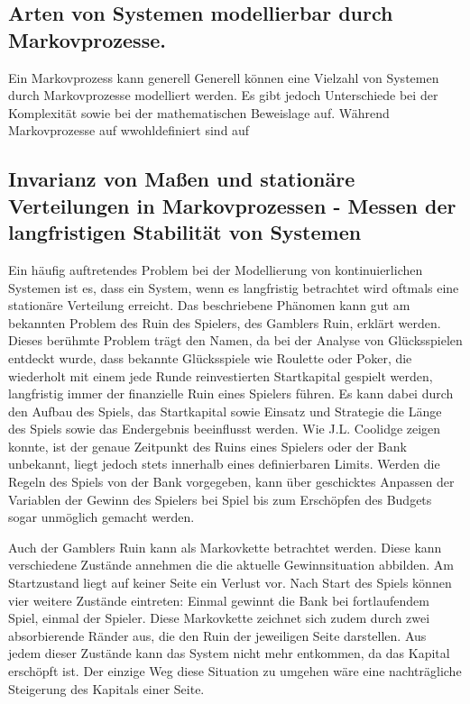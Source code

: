 \subsection{Arten von Systemen modellierbar durch Markovprozesse.}

Ein Markovprozess kann generell 
Generell können eine Vielzahl von Systemen durch Markovprozesse modelliert werden. Es gibt jedoch Unterschiede bei der Komplexität sowie bei der mathematischen Beweislage auf. Während Markovprozesse auf wwohldefiniert sind auf

\subsection{Invarianz von Maßen und stationäre Verteilungen in Markovprozessen - Messen der langfristigen Stabilität von Systemen}

Ein häufig auftretendes Problem bei der Modellierung von kontinuierlichen Systemen ist es, dass ein System, wenn es langfristig betrachtet wird oftmals eine stationäre Verteilung erreicht. Das beschriebene Phänomen kann gut am bekannten Problem des Ruin des Spielers, des Gamblers Ruin, erklärt werden. Dieses berühmte Problem trägt den Namen, da bei der Analyse von Glücksspielen entdeckt wurde, dass bekannte Glücksspiele wie Roulette oder Poker, die wiederholt mit einem jede Runde reinvestierten Startkapital gespielt werden, langfristig immer der finanzielle Ruin eines Spielers führen. Es kann dabei durch den Aufbau des Spiels, das Startkapital sowie Einsatz und Strategie die Länge des Spiels sowie das Endergebnis beeinflusst werden. Wie J.L. Coolidge zeigen konnte, ist der genaue Zeitpunkt des Ruins eines Spielers oder der Bank unbekannt, liegt jedoch stets innerhalb eines definierbaren Limits. Werden die Regeln des Spiels von der Bank vorgegeben, kann über geschicktes Anpassen der Variablen der Gewinn des Spielers bei Spiel bis zum Erschöpfen des Budgets sogar unmöglich gemacht werden. \citep{coolidge1909gamblers}

Auch der Gamblers Ruin kann als Markovkette betrachtet werden. Diese kann verschiedene Zustände annehmen die die aktuelle Gewinnsituation abbilden. Am Startzustand liegt auf keiner Seite ein Verlust vor. Nach Start des Spiels können vier weitere Zustände eintreten: Einmal gewinnt die Bank bei fortlaufendem Spiel, einmal der Spieler. Diese Markovkette zeichnet sich zudem durch zwei absorbierende Ränder aus, die den Ruin der jeweiligen Seite darstellen. Aus jedem dieser Zustände kann das System nicht mehr entkommen, da das Kapital erschöpft ist. Der einzige Weg diese Situation zu umgehen wäre eine nachträgliche Steigerung des Kapitals einer Seite.

